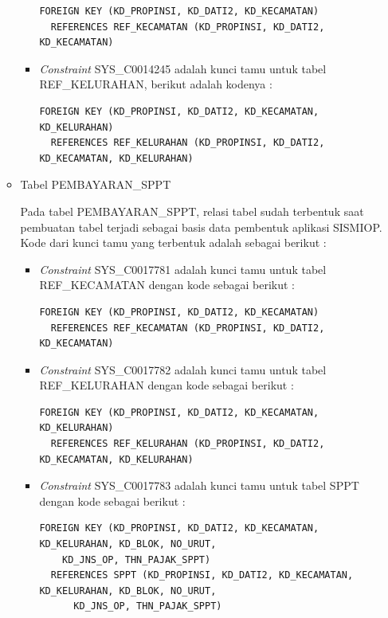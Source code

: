 \documentclass[pdftex,12pt, oneside]{article}
\begin{document}
\begin{enumerate}[1.]
\begin{itemize}
\begin{itemize}
\begin{lstlisting}
FOREIGN KEY (KD_PROPINSI, KD_DATI2, KD_KECAMATAN) 
  REFERENCES REF_KECAMATAN (KD_PROPINSI, KD_DATI2, KD_KECAMATAN)
\end{lstlisting}			
			
			\item \textit{Constraint} SYS\_C0014245 adalah kunci tamu untuk tabel REF\_KELURAHAN, berikut adalah kodenya :
			
\begin{lstlisting}
FOREIGN KEY (KD_PROPINSI, KD_DATI2, KD_KECAMATAN, KD_KELURAHAN)
  REFERENCES REF_KELURAHAN (KD_PROPINSI, KD_DATI2, KD_KECAMATAN, KD_KELURAHAN)
\end{lstlisting}

		\end{itemize}
	
	\item Tabel PEMBAYARAN\_SPPT
	
	Pada tabel PEMBAYARAN\_SPPT, relasi tabel sudah terbentuk saat pembuatan tabel terjadi sebagai basis data pembentuk aplikasi SISMIOP. Kode dari kunci tamu yang terbentuk adalah sebagai berikut :
	
		\begin{itemize}
			\item \textit{Constraint} SYS\_C0017781 adalah kunci tamu untuk tabel REF\_KECAMATAN dengan kode sebagai berikut :
			
\begin{lstlisting}
FOREIGN KEY (KD_PROPINSI, KD_DATI2, KD_KECAMATAN) 
  REFERENCES REF_KECAMATAN (KD_PROPINSI, KD_DATI2, KD_KECAMATAN)
\end{lstlisting}
			
			\item \textit{Constraint} SYS\_C0017782 adalah kunci tamu untuk tabel REF\_KELURAHAN dengan kode sebagai berikut :
			
\begin{lstlisting}
FOREIGN KEY (KD_PROPINSI, KD_DATI2, KD_KECAMATAN, KD_KELURAHAN)
  REFERENCES REF_KELURAHAN (KD_PROPINSI, KD_DATI2, KD_KECAMATAN, KD_KELURAHAN)
\end{lstlisting}			
			
			\item \textit{Constraint} SYS\_C0017783 adalah kunci tamu untuk tabel SPPT dengan kode sebagai berikut :
			
\begin{lstlisting}
FOREIGN KEY (KD_PROPINSI, KD_DATI2, KD_KECAMATAN, KD_KELURAHAN, KD_BLOK, NO_URUT,
    KD_JNS_OP, THN_PAJAK_SPPT)
  REFERENCES SPPT (KD_PROPINSI, KD_DATI2, KD_KECAMATAN, KD_KELURAHAN, KD_BLOK, NO_URUT,
      KD_JNS_OP, THN_PAJAK_SPPT)
\end{lstlisting}
			

\end{itemize}
\end{itemize}
\end{enumerate}
\end{document}
